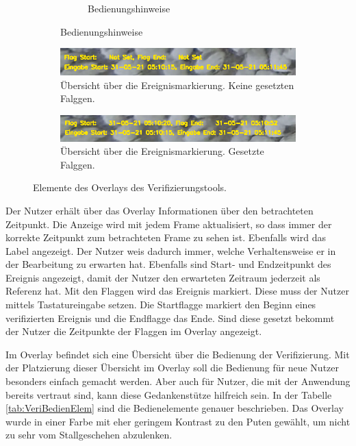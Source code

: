 \begin{figure}[hp]
\begin{subfigure}[b]{0.9\textwidth}
\begin{subfigure}[b]{0.4\textwidth}
             \caption{Bedienungshinweise}
         \end{subfigure}
     \end{subfigure}
     \begin{subfigure}[b]{0.9\textwidth}
         \centering
         \includegraphics[width=\textwidth]{img/Verifikationstool/Verifikation Video mit Maske Ereignisinfos.png}
         \caption{Übersicht über die Ereignismarkierung. Keine gesetzten Falggen.}
     \end{subfigure}
     \hfill
     \begin{subfigure}[b]{0.9\textwidth}
         \centering
         \includegraphics[width=\textwidth]{img/Verifikationstool/Verifikation Video mit Maske Ereignisinfos set.png}
         \caption{Übersicht über die Ereignismarkierung. Gesetzte Falggen.}
     \end{subfigure}
     \caption[Elemente des Overlays des Verifizierungstools.]{Elemente des Overlays des Verifizierungstools.}
     \label{fig:VerifOverlay Elem}
\end{figure}

Der Nutzer erhält über das Overlay Informationen über den betrachteten Zeitpunkt. Die Anzeige wird mit jedem Frame aktualisiert, so dass immer der korrekte Zeitpunkt zum betrachteten Frame zu sehen ist. Ebenfalls wird das Label angezeigt. Der Nutzer weis dadurch immer, welche Verhaltensweise er in der Bearbeitung zu erwarten hat. Ebenfalls sind Start- und Endzeitpunkt des Ereignis angezeigt, damit der Nutzer den erwarteten Zeitraum jederzeit als Referenz hat. Mit den Flaggen wird das Ereignis markiert. Diese muss der Nutzer mittels Tastatureingabe setzen. Die Startflagge markiert den Beginn eines verifizierten Ereignis und die Endflagge das Ende. Sind diese gesetzt bekommt der Nutzer die Zeitpunkte der Flaggen im Overlay angezeigt. \par

Im Overlay befindet sich eine Übersicht über die Bedienung der Verifizierung. Mit der Platzierung dieser Übersicht im Overlay soll die Bedienung für neue Nutzer besonders einfach gemacht werden. Aber auch für Nutzer, die mit der Anwendung bereits vertraut sind, kann diese Gedankenstütze hilfreich sein. In der Tabelle \ref{tab:VeriBedienElem} sind die Bedienelemente genauer beschrieben. Das Overlay wurde in einer Farbe mit eher geringem Kontrast zu den Puten gewählt, um nicht zu sehr vom Stallgeschehen abzulenken. 

